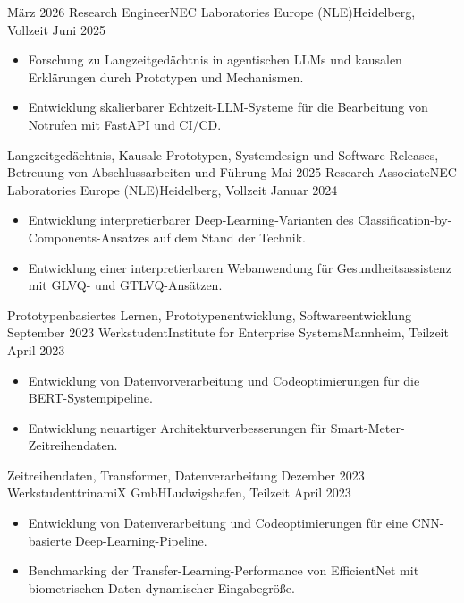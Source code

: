 \begin{experiences}
  \experience
    {März 2026} {Research Engineer}{NEC Laboratories Europe (NLE)}{Heidelberg, Vollzeit}
    {Juni 2025} {
      \begin{itemize}
        \item{Forschung zu Langzeitgedächtnis in agentischen LLMs und kausalen Erklärungen durch Prototypen und Mechanismen.}
        \item{Entwicklung skalierbarer Echtzeit-LLM-Systeme für die Bearbeitung von Notrufen mit FastAPI und CI/CD.}
      \end{itemize}
    }
    {Langzeitgedächtnis, Kausale Prototypen, Systemdesign und Software-Releases, Betreuung von Abschlussarbeiten und Führung}
  \emptySeparator
  \experience
    {Mai 2025} {Research Associate}{NEC Laboratories Europe (NLE)}{Heidelberg, Vollzeit}
    {Januar 2024} {
      \begin{itemize}
        \item{Entwicklung interpretierbarer Deep-Learning-Varianten des Classification-by-Components-Ansatzes auf dem Stand der Technik.}
        \item{Entwicklung einer interpretierbaren Webanwendung für Gesundheitsassistenz mit GLVQ- und GTLVQ-Ansätzen.}
      \end{itemize}
    }
    {Prototypenbasiertes Lernen, Prototypenentwicklung, Softwareentwicklung}
  \emptySeparator
  \experience
    {September 2023} {Werkstudent}{Institute for Enterprise Systems}{Mannheim, Teilzeit}
    {April 2023} {
      \begin{itemize}
        \item{Entwicklung von Datenvorverarbeitung und Codeoptimierungen für die BERT-Systempipeline.}
        \item{Entwicklung neuartiger Architekturverbesserungen für Smart-Meter-Zeitreihendaten.}
      \end{itemize}
    }
    {Zeitreihendaten, Transformer, Datenverarbeitung}
  \emptySeparator
  \experience
    {Dezember 2023} {Werkstudent}{trinamiX GmbH}{Ludwigshafen, Teilzeit}
    {April 2023} {
      \begin{itemize}
        \item{Entwicklung von Datenverarbeitung und Codeoptimierungen für eine CNN-basierte Deep-Learning-Pipeline.}
        \item{Benchmarking der Transfer-Learning-Performance von EfficientNet mit biometrischen Daten dynamischer Eingabegröße.}

\end{itemize}}
\end{experiences}
